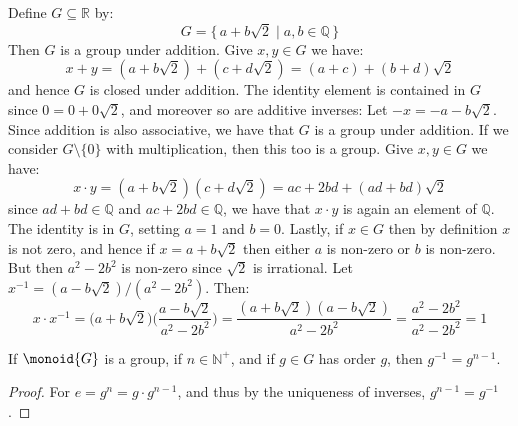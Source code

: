 \documentclass{article}                                                        %
\begin{document}
        \begin{example}
            Define $G\subseteq\mathbb{R}$ by:
            \begin{equation}
                G=\{\,a+b\sqrt{2}\;|\;a,b\in\mathbb{Q}\,\}
            \end{equation}
            Then $G$ is a group under addition. Give $x,y\in{G}$ we have:
            \begin{equation}
                x+y=(a+b\sqrt{2})+(c+d\sqrt{2})=(a+c)+(b+d)\sqrt{2}
            \end{equation}
            and hence $G$ is closed under addition. The identity element is
            contained in $G$ since $0=0+0\sqrt{2}$, and moreover so are
            additive inverses: Let $\minus{x}=\minus{a}-b\sqrt{2}$. Since
            addition is also associative, we have that $G$ is a group under
            addition. If we consider $G\setminus\{0\}$ with multiplication, then
            this too is a group. Give $x,y\in{G}$ we have:
            \begin{equation}
                x\cdot{y}=(a+b\sqrt{2})(c+d\sqrt{2})
                    =ac+2bd+(ad+bd)\sqrt{2}
            \end{equation}
            since $ad+bd\in\mathbb{Q}$ and $ac+2bd\in\mathbb{Q}$, we have that
            $x\cdot{y}$ is again an element of $\mathbb{Q}$. The identity is in
            $G$, setting $a=1$ and $b=0$. Lastly, if $x\in{G}$ then by
            definition $x$ is not zero, and hence if $x=a+b\sqrt{2}$ then either
            $a$ is non-zero or $b$ is non-zero. But then $a^{2}-2b^{2}$ is
            non-zero since $\sqrt{2}$ is irrational. Let
            $x^{\minus{1}}=(a-b\sqrt{2})/(a^{2}-2b^{2})$. Then:
            \begin{equation}
                x\cdot{x}^{\minus{1}}=
                \big(a+b\sqrt{2}\big)\big(\frac{a-b\sqrt{2}}{a^{2}-2b^{2}}\big)
                =\frac{(a+b\sqrt{2})(a-b\sqrt{2})}{a^{2}-2b^{2}}
                =\frac{a^{2}-2b^{2}}{a^{2}-2b^{2}}=1
            \end{equation}
        \end{example}
        \begin{theorem}
            If $\monoid{G}$ is a group, if $n\in\mathbb{N}^{+}$, and if
            $g\in{G}$ has order $g$, then $g^{\minus{1}}=g^{n-1}$.
        \end{theorem}
        \begin{proof}
            For $e=g^{n}=g\cdot{g}^{n-1}$, and thus by the uniqueness of
            inverses, $g^{n-1}=g^{\minus{1}}$.
        \end{proof}
\end{document}
